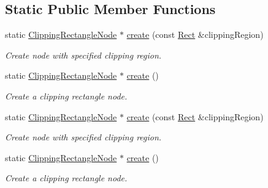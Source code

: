 \subsection*{Static Public Member Functions}
\begin{DoxyCompactItemize}
\item 
static \hyperlink{classClippingRectangleNode}{Clipping\+Rectangle\+Node} $\ast$ \hyperlink{classClippingRectangleNode_ad4837ccec4848abc6139659980152fff}{create} (const \hyperlink{classRect}{Rect} \&clipping\+Region)
\begin{DoxyCompactList}\small\item\em Create node with specified clipping region. \end{DoxyCompactList}\item 
static \hyperlink{classClippingRectangleNode}{Clipping\+Rectangle\+Node} $\ast$ \hyperlink{classClippingRectangleNode_a69d4c06c031688276ed42221800adef4}{create} ()
\begin{DoxyCompactList}\small\item\em Create a clipping rectangle node. \end{DoxyCompactList}\item 
static \hyperlink{classClippingRectangleNode}{Clipping\+Rectangle\+Node} $\ast$ \hyperlink{classClippingRectangleNode_a2889a74ae21277b8e8f142c5b7da4d3a}{create} (const \hyperlink{classRect}{Rect} \&clipping\+Region)
\begin{DoxyCompactList}\small\item\em Create node with specified clipping region. \end{DoxyCompactList}\item 
static \hyperlink{classClippingRectangleNode}{Clipping\+Rectangle\+Node} $\ast$ \hyperlink{classClippingRectangleNode_afc5eb0f59ea2d381e67875d7d1f7318d}{create} ()
\begin{DoxyCompactList}\small\item\em Create a clipping rectangle node. \end{DoxyCompactList}\end{DoxyCompactItemize}
